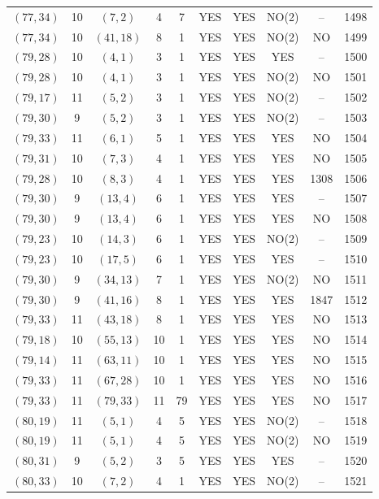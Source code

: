 \begin{longtable}{|c|c|c|c|c|c|c|c|c|c|}
$(77, 34)$ & 10 & $(7, 2)$ & 4 & 7 & YES & YES & NO(2) & -- & 1498\\
$(77, 34)$ & 10 & $(41, 18)$ & 8 & 1 & YES & YES & NO(2) & NO & 1499\\
$(79, 28)$ & 10 & $(4, 1)$ & 3 & 1 & YES & YES & YES & -- & 1500\\
$(79, 28)$ & 10 & $(4, 1)$ & 3 & 1 & YES & YES & NO(2) & NO & 1501\\
$(79, 17)$ & 11 & $(5, 2)$ & 3 & 1 & YES & YES & NO(2) & -- & 1502\\
$(79, 30)$ & 9 & $(5, 2)$ & 3 & 1 & YES & YES & NO(2) & -- & 1503\\
$(79, 33)$ & 11 & $(6, 1)$ & 5 & 1 & YES & YES & YES & NO & 1504\\
$(79, 31)$ & 10 & $(7, 3)$ & 4 & 1 & YES & YES & YES & NO & 1505\\
$(79, 28)$ & 10 & $(8, 3)$ & 4 & 1 & YES & YES & YES & 1308 & 1506\\
$(79, 30)$ & 9 & $(13, 4)$ & 6 & 1 & YES & YES & YES & -- & 1507\\
$(79, 30)$ & 9 & $(13, 4)$ & 6 & 1 & YES & YES & YES & NO & 1508\\
$(79, 23)$ & 10 & $(14, 3)$ & 6 & 1 & YES & YES & NO(2) & -- & 1509\\
$(79, 23)$ & 10 & $(17, 5)$ & 6 & 1 & YES & YES & YES & -- & 1510\\
$(79, 30)$ & 9 & $(34, 13)$ & 7 & 1 & YES & YES & NO(2) & NO & 1511\\
$(79, 30)$ & 9 & $(41, 16)$ & 8 & 1 & YES & YES & YES & 1847 & 1512\\
$(79, 33)$ & 11 & $(43, 18)$ & 8 & 1 & YES & YES & YES & NO & 1513\\
$(79, 18)$ & 10 & $(55, 13)$ & 10 & 1 & YES & YES & YES & NO & 1514\\
$(79, 14)$ & 11 & $(63, 11)$ & 10 & 1 & YES & YES & YES & NO & 1515\\
$(79, 33)$ & 11 & $(67, 28)$ & 10 & 1 & YES & YES & YES & NO & 1516\\
$(79, 33)$ & 11 & $(79, 33)$ & 11 & 79 & YES & YES & YES & NO & 1517\\
$(80, 19)$ & 11 & $(5, 1)$ & 4 & 5 & YES & YES & NO(2) & -- & 1518\\
$(80, 19)$ & 11 & $(5, 1)$ & 4 & 5 & YES & YES & NO(2) & NO & 1519\\
$(80, 31)$ & 9 & $(5, 2)$ & 3 & 5 & YES & YES & YES & -- & 1520\\
$(80, 33)$ & 10 & $(7, 2)$ & 4 & 1 & YES & YES & NO(2) & -- & 1521\\

\end{longtable}
